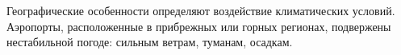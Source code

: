 Географические особенности определяют воздействие климатических условий.
Аэропорты, расположенные в прибрежных или горных регионах, подвержены нестабильной погоде: сильным ветрам, туманам, осадкам.




%
%
%
%
%
%
